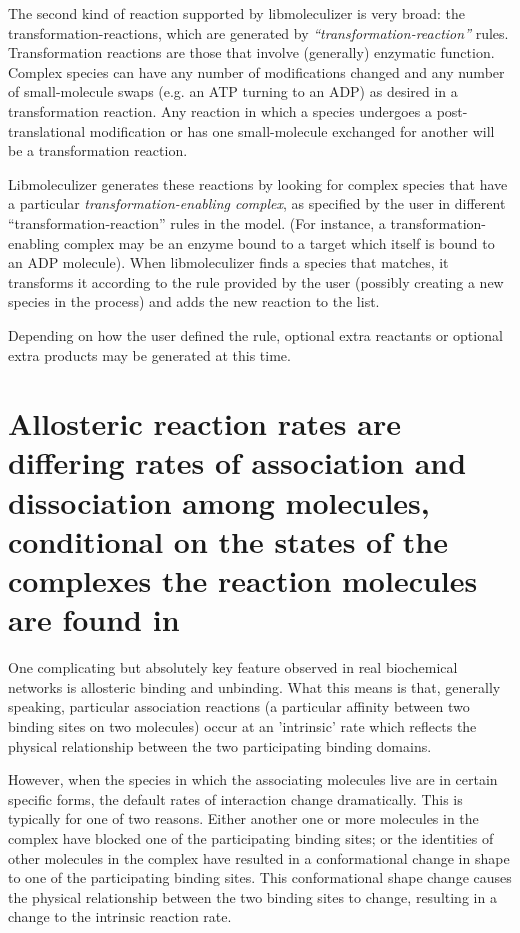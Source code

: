 The second kind of reaction supported by libmoleculizer is very broad:
the transformation-reactions, which are generated by {\it
  ``transformation-reaction''} rules.  Transformation reactions are
those that involve (generally) enzymatic function.  Complex species
can have any number of modifications changed and any number of
small-molecule swaps (e.g. an ATP turning to an ADP) as desired in a
transformation reaction.  Any reaction in which a species undergoes a
post-translational modification or has one small-molecule exchanged
for another will be a transformation reaction.

Libmoleculizer generates these reactions by looking for complex
species that have a particular {\it transformation-enabling complex}, as
specified by the user in different ``transformation-reaction'' rules
in the model. (For instance, a transformation-enabling complex may be
an enzyme bound to a target which itself is bound to an ADP
molecule).  When libmoleculizer finds a species that matches, it
transforms it according to the rule provided by the user (possibly
creating a new species in the process) and adds the new
reaction to the list.  

Depending on how the user defined the rule, optional extra reactants
or optional extra products may be generated at this time.  

\section{Allosteric reaction rates are differing rates of association
  and dissociation among molecules, conditional on the states of
  the complexes the reaction molecules are found in}  

One complicating but absolutely key feature observed in real
biochemical networks is allosteric binding and unbinding.  What this
means is that, generally speaking, particular association reactions (a
particular affinity between two binding sites on two molecules) occur
at an 'intrinsic' rate which reflects the physical relationship
between the two participating binding domains.  

However, when the species in which the associating molecules live are
in certain specific forms, the default rates of interaction change
dramatically. This is typically for one of two reasons.  Either
another one or more molecules in the complex have blocked one of the
participating binding sites; or the identities of other molecules in
the complex have resulted in a conformational change in shape to one
of the participating binding sites.  This conformational shape change
causes the physical relationship between the two binding sites to
change, resulting in a change to the intrinsic reaction rate.  

